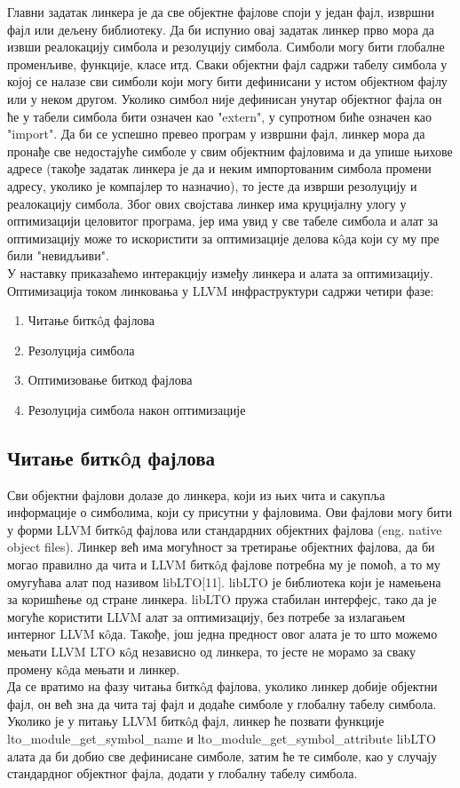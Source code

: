 \documentclass[12pt,oneside]{memoir}
\begin{document}
Главни задатак линкера је да све објектне фајлове споји у један фајл, извршни фајл
или дељену библиотеку. 
Да би испунио овај задатак линкер прво мора да извши реалокацију симбола и резолуцију
симбола.
Симболи могу бити глобалне променљиве, функције, класе итд. 
Сваки објектни фајл садржи табелу симбола у којој се налазе сви симболи који 
могу бити дефинисани у истом објектном фајлу или у неком другом.
Уколико симбол није дефинисан унутар објектног фајла он ће у табели симбола бити
означен као "extern", у супротном биће означен као "import".
Да би се успешно превео програм у извршни фајл, линкер мора да пронађе све 
недостајуће симболе у свим објектним фајловима и да упише њихове адресе (такође задатак
линкера је да и неким импортованим симбола промени адресу, уколико је компајлер то назначио),
то јесте да изврши резолуцију и реалокацију симбола.
Због ових својстава линкер има круцијалну улогу у оптимизацији целовитог програма, јер
има увид у све табеле симбола и алат за оптимизацију може то искористити за оптимизације
делова к\^{o}да који су му пре били "невидљиви". 
\\
У наставку приказаћемо интеракцију између линкера и алата за оптимизацију.
Оптимизација током линковања у LLVM инфраструктури садржи четири фазе:
\begin{enumerate}
\item Читање битк\^{o}д фајлова
\item Резолуција симбола
\item Оптимизовање биткод фајлова
\item Резолуција симбола након оптимизације
\end{enumerate}

\subsection{Читање битк\^{o}д фајлова}
Сви објектни фајлови долазе до линкера, који из њих чита и сакупља информације
о симболима, који су присутни у фајловима.
Ови фајлови могу бити у форми LLVM битк\^{o}д фајлова или стандардних објектних
фајлова (eng. native object files).
Линкер већ има могућност за третирање објектних фајлова, да би могао
правилно да чита и LLVM битк\^{o}д фајлове потребна му је помоћ, а то му омугућава
алат под називом libLTO[11].
libLTO је библиотека који је намењена за коришћење од стране линкера.
libLTO пружа стабилан интерфејс, тако да је могуће користити
LLVM алат за оптимизацију, без потребе за излагањем интерног LLVM к\^{o}да.
Такође, још једна предност овог алата је то што можемо мењати LLVM LTO к\^{o}д независно
од линкера, то јесте не морамо за сваку промену к\^{o}да мењати и линкер.
\\
Да се вратимо на фазу читања битк\^{o}д фајлова, уколико линкер добије
објектни фајл, он већ зна да чита тај фајл и додаће симболе у глобалну табелу симбола.
Уколико је у питању LLVM битк\^{o}д фајл, линкер ће позвати функције \\
lto{\_}module{\_}get{\_}symbol{\_}name и 
lto{\_}module{\_}get{\_}symbol{\_}attribute 
libLTO алата да би добио све дефинисане  симболе, затим ће те симболе, 
као у случају стандардног објектног фајла, додати у глобалну табелу симбола.
\end{document}
